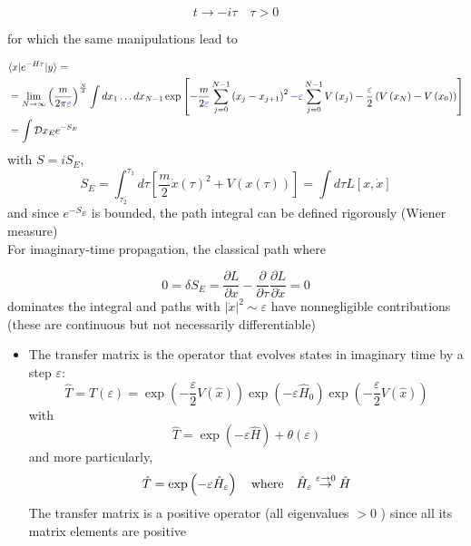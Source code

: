 \begin{equation}
t \rightarrow-i \tau \quad \tau>0
\end{equation}

for which the same manipulations lead to

\begin{equation}
\begin{aligned}
& \langle x| e^{-H \tau}|y\rangle=\\
& =\lim _{N \rightarrow \infty}\left(\frac{m}{2 \pi {\color{blue} \varepsilon}}\right)^{\frac{N}{2}} \int d x_{1} \ldots d x_{N-1} \exp \left[- \frac{m}{2 {\color{blue}\varepsilon}} \sum_{j=0}^{N-1}\left(x_{j}-x_{j+1}\right)^{2}{\color{blue}-\varepsilon} \sum_{j=0}^{N-1} V\left(x_{j}\right)-\frac{ {\color{blue}\varepsilon}}{2}\left(V\left(x_{N}\right)-V\left(x_{0}\right)\right)\right] \\
& =\int \mathcal{D}{x_{E}} e^{-S_{E}} 
\end{aligned}
\end{equation}
with $S=i S_{E}$,
\begin{equation}
S_{E}=\int_{\tau_{2}}^{\tau_1} d \tau\left[\frac{m}{2} \dot{x}{(\tau)}^{2}+V(x(\tau))\right]=\int d \tau L[x, \dot{x}] 
\end{equation}
and since \(e^{-S_{E}}\) is bounded, the path integral can be defined rigorously (Wiener measure)\\
For imaginary-time propagation, the classical path where

\begin{equation}
0=\delta S_{E}=\frac{\partial L}{\partial x}-\frac{\partial}{\partial \tau} \frac{\partial L}{\partial \dot{x}}=0
\end{equation}
dominates the integral and paths with \(|\dot{x}|^{2}\sim\varepsilon\) have nonnegligible contributions (these are continuous but not necessarily differentiable)

\begin{itemize}
  \item The transfer matrix is the operator that evolves states in imaginary time by a step \({\varepsilon}\):
  \begin{equation}
  \hat{T}=T(\varepsilon)=\exp \left(-\frac{\varepsilon}{2} V(\hat{x})\right) \exp \left(-\varepsilon \hat{H}_{0}\right) \exp \left(-\frac{\varepsilon}{2} V(\hat{x})\right)\end{equation}
with
\begin{equation}
\hat{T}=\exp (-\varepsilon \hat{H})+\theta(\varepsilon) \end{equation}
and more particularly, 
\begin{equation}
\hat T=\exp \left(-\varepsilon \hat H_{\varepsilon}\right) \quad {\rm where}\quad \hat H_{\varepsilon} \stackrel{\varepsilon \rightarrow 0}{\rightarrow} \hat H
\end{equation}
The transfer matrix is a positive operator (all eigenvalues \(>0\) ) since all its matrix elements are positive
\end{itemize}


